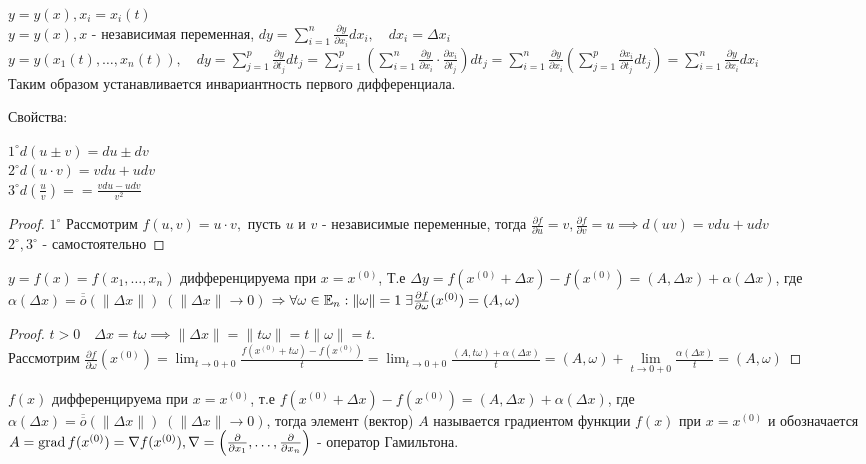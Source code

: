 \documentclass[../main.tex]{subfiles}
\begin{document}
$y=y(x), x_{i}=x_{i}(t)$
\\$y= y(x),x$ - независимая переменная, $dy = \sum_{i   =1}^{n  } \frac{\partial{y}}{\partial{x_{i}}}dx_{i}, \quad dx_{i}=\Delta x_{i}$
\\$y=y(x_{1}(t),\dots,x_{n}(t)),\quad dy = \sum_{j=1}^{p    } \frac{\partial{y}}{\partial{t_{j}}}dt_{j}= \sum_{j=1}^{p  }\left(\sum_{i=1}^{n}\frac{\partial{y}}{\partial{x_{i}}}\cdot \frac{ \partial{x_{i}}}{\partial{t_{j}}} \right) dt_{j}=\sum_{i   =1}^{n}\frac{\partial{y}}{\partial{x_{i}}}\left(\sum_{j=1}^{p   } \frac{\partial{x_{i}}}{\partial{t_{j}}}dt_{j}\right) = \sum_{i    =1}^{n} \frac{\partial{y}}{\partial{x_{i}}}dx_{i}   $
\\Таким образом устанавливается инвариантность первого дифференциала.

Свойства:

\noindent$1^{\circ} d(u\pm v)=du\pm dv$\\ 
$2^{\circ} d(u\cdot v)=vdu+udv$\\ 
$3^{\circ} d\left(\frac{u}{v}\right)= = \frac{vdu-udv}{v^{2}}$

\begin{proof}
    $1^{\circ}$ Рассмотрим $f(u,v)=u\cdot v,$ пусть $u$ и $v$ - независимые переменные, тогда $\frac{\partial{f}}{\partial{u}}=v, \frac{\partial{f}}{\partial{v}}=u\implies d(uv)=vdu+udv$
    \\$2^{\circ},3^{\circ}$ - самостоятельно

\end{proof}
\begin{theorem}
    $y=f(x)=f(x_{1},\dots,x_{n})$ дифференцируема при $x=x^{(0)}$, Т.е $\Delta y = f(x^{(0)}+\Delta x)-f(x^{(0)})= (A,\Delta x) + \alpha(\Delta x)$, где $\alpha(\Delta x) = \overline{\overline{o}}(\|\Delta x\|)\; (\|\Delta x\| \to 0)$
    $\Rightarrow \forall \omega \in \mathbb{E}_{n}: \|\omega\| = 1 \; \exists \frac{\partial{f}}{\partial{\omega}}(x^{(0)}) = (A,\omega)$
\end{theorem}
\begin{proof}
    $t>0\quad \Delta x = t\omega\implies \|\Delta x\| = \|t \omega\| = t\|\omega\| = t$. 
    \\Рассмотрим $\frac{\partial{f}}{\partial{\omega}}(x^{(0)}) = \lim_{t\to 0+0} \frac{f(x^{(0)}+t\omega)-f(x^{(0)})}{t} = \lim_{t\to 0+0} \frac{(A,t\omega)+\alpha(\Delta x)}{t} =  (A,\omega)+ \lim\limits_{ t\to 0+0} \frac{\alpha(\Delta x)}{t} = (A,\omega)$ 
\end{proof}
\begin{definition}
    $f(x)$ дифференцируема при $x=x^{(0)}$, т.е $f(x^{(0)}+\Delta x)-f(x^{(0)}) = (A,\Delta x)+\alpha(\Delta x)$, где $\alpha(\Delta x) = \overline{\overline{o}}(\|\Delta x\|)\; (\|\Delta x\| \to 0)$, тогда элемент (вектор) $A$ называется градиентом функции $f(x)$ при $x=x^{(0)}$ и обозначается $A=\operatorname{grad}{f(x^{(0)})}=\nabla f(x^{(0)}), \nabla = \left( \frac{\partial}{\partial{x_{1}}}, \dots, \frac{\partial}{\partial{x_{n}}}\right)$ - оператор Гамильтона. 
\end{definition}
\end{document}

